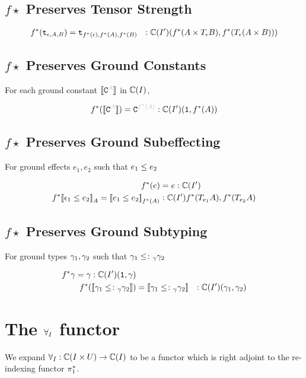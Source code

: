 \documentclass{report}
\begin{document}
\subsection{$f\star$ Preserves Tensor Strength}
\begin{align*}
    f^*(\texttt{t}_{\epsilon, A, B}) &= \texttt{t}_{f^*(\epsilon), f^*(A), f^*(B)} &: \mathbb{C}(I')(f^*(A\times T_{\epsilon}{B}), f^*(T_{\epsilon}{(A\times B)}))
\end{align*}
\subsection{$f\star$ Preserves Ground Constants}
For each ground constant $\deno{\const{A}}$ in $\mathbb{C}(I)$,

\begin{align*}
    f\star(\deno{\const{A}}) = \const{f\star(A)} : \C(I')(\1, f\star(A))
\end{align*}
\subsection{$f\star$ Preserves Ground Subeffecting}
For ground effects $e_1, e_2$ such that $e_1\leq e_2$



\begin{align*}
    f^*(e) & = e: \mathbb{C}(I')\\
    f^*{\bf [\![}\epsilon_1\leq e_2{\bf ]\!]}_A = {\bf [\![}e_1 \leq e_2{\bf ]\!]}_{f^*(A)} &:\mathbb{C}(I'){f^*(T_{e_1}{A}), f^*(T_{e_2}{A})} \\
\end{align*}
\subsection{$f\star$ Preserves Ground Subtyping}
For ground types $\gamma_1, \gamma_2$ such that $\gamma_1\leq\colon_\gamma\gamma_2$

\begin{align*}
    f^*{\gamma} = \gamma: \mathbb{C}(I')(\texttt{1}, \gamma)\\
    f^*({\bf [\![}\gamma_1 \leq\colon_\gamma \gamma_2{\bf ]\!]}) & = {\bf [\![}\gamma_1 \leq\colon_\gamma \gamma_2{\bf ]\!]} &: \mathbb{C}(I')(\gamma_1, \gamma_2)\\
\end{align*}

\section{The $\forall_I$ functor}

We expand $\forall_I: \mathbb{C}(I\times U) \rightarrow \mathbb{C}(I)$ to be a functor which is right adjoint to the re-indexing functor $\pi_1^*$.
\end{document}
